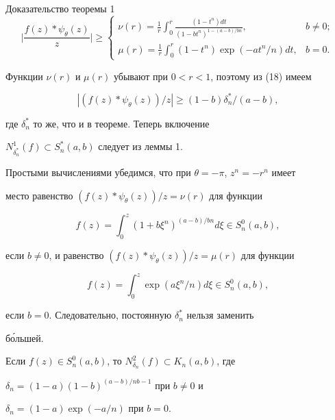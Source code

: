 \begin{pf*}{Доказательство теоремы 1}
\begin{equation}
\biggl|\frac{f(z)*\psi_\theta(z)}{z} \biggr|\ge 


\begin{cases} 


\nu(r)=\displaystyle\frac{1}{r}\int^r_0 


\frac{(1-t^n)dt}{(1-bt^n)^{1-(a-b)/bn}}, & b\ne 0;\\ 


\mu(r)=\displaystyle\frac{1}{r}\int^r_0 


(1-t^n)\exp(-at^n/n)dt,& b=0. 


\end{cases} 


\end{equation} 


Функции $\nu(r)$ и $\mu(r)$ убывают при $0<r<1$, поэтому из (18) имеем 


$$ 


|(f(z)*\psi_\theta(z))/z|\ge (1-b)\delta^*_n/(a-b), 


$$ 


где $\delta^*_n$ то же, что и в теореме. Теперь включение 


$N^1_{\delta^*_n}(f)\subset S^*_n(a,b)$ следует из леммы 1. 


 


Простыми вычислениями убедимся, что при $\theta=-\pi$, $z^n=-r^n$ имеет 


место равенство $(f(z)*\psi_\theta(z))/z=\nu(r)$ для функции  


$$ 


f(z)=\int^z_0(1+b\xi^n)^{(a-b)/bn}d\xi\in S^0_n(a,b), 


$$ 


если $b\ne 0$, и равенство $(f(z)*\psi_\theta(z))/z=\mu(r)$ для функции 


$$ 


f(z)=\int^z_0\exp(a\xi^n/n)d\xi\in S^0_n(a,b), 


$$ 


если $b=0$. Следовательно, постоянную $\delta^*_n$ нельзя заменить 


б\'ольшей. 


\end{pf*} 


 


\begin{thm} 


Если $f(z)\in S^0_n(a,b)$, то $N^2_{\delta_n}(f)\subset K_n(a,b)$, где 


$\delta_n=(1-a)(1-b)^{(a-b)/nb-1}$ при $b\ne 0$ и 


$\delta_n=(1-a)\exp(-a/n)$ при $b=0$. 


\end{thm} 


